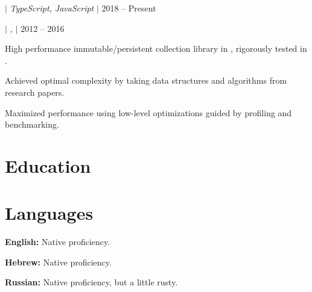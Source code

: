 \documentclass[a4paper,11pt]{article}
\begin{document}
\begin{sectionList}
\begin{project}{\textbf{\parjs} $|$ \emph{TypeScript, JavaScript} $|$ }{2018 -- Present}
    \end{project}
    \begin{project}{\textbf{\imms} $|$ \emph{, } $|$ }{2012 -- 2016}
        \item High performance immutable/persistent collection library in , rigorously tested in .
        \item Achieved optimal complexity by taking data structures and algorithms from research papers.
        \item Maximized performance using low-level optimizations guided by profiling and benchmarking.
    \end{project}
\end{sectionList}%

\section{Education}
\begin{sectionList}
    \begin{eduTechnion}
    \end{eduTechnion}
\end{sectionList}%
\section{Languages}
\begin{itemList}
    \item \textbf{English:} Native proficiency.
    \item \textbf{Hebrew:} Native proficiency.
    \item \textbf{Russian:} Native proficiency, but a little rusty.
\end{itemList}
\end{document}

